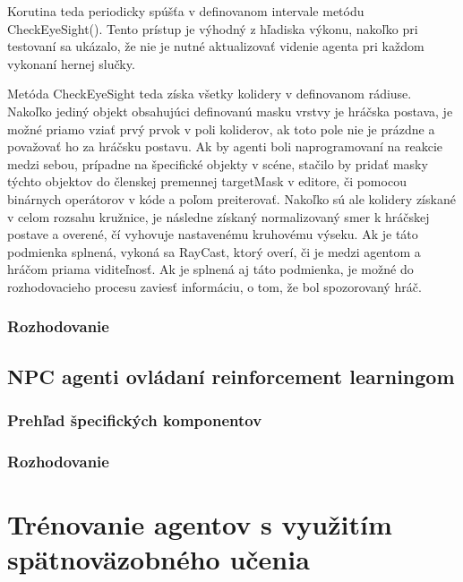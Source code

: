 \documentclass[slovak, master]{diploma}
\begin{document}
Korutina teda periodicky spúšťa v definovanom intervale metódu CheckEyeSight(). Tento prístup je výhodný z hľadiska výkonu, nakoľko pri testovaní sa ukázalo, že nie je nutné aktualizovať videnie agenta pri každom vykonaní hernej slučky. 

Metóda CheckEyeSight teda získa všetky kolidery v definovanom rádiuse. Nakoľko jediný objekt obsahujúci definovanú masku vrstvy je hráčska postava, je možné priamo vziať prvý prvok v poli koliderov, ak toto pole nie je prázdne a považovať ho za hráčsku postavu. Ak by agenti boli naprogramovaní na reakcie medzi sebou, prípadne na špecifické objekty v scéne, stačilo by pridať masky týchto objektov do členskej premennej targetMask v editore, či pomocou binárnych operátorov v kóde a poľom preiterovať. Nakoľko sú ale kolidery získané v celom rozsahu kružnice, je následne získaný normalizovaný smer k hráčskej postave a overené, čí vyhovuje nastavenému kruhovému výseku. Ak je táto podmienka splnená, vykoná sa RayCast, ktorý overí, či je medzi agentom a hráčom priama viditeľnosť. Ak je splnená aj táto podmienka, je možné do rozhodovacieho procesu zaviesť informáciu, o tom, že bol spozorovaný hráč. 

\subsection{Rozhodovanie}
\label{sec:ImplDecisionTrees}

\section{NPC agenti ovládaní reinforcement learningom}
\label{sec:AgentsWithBrain}
\subsection{Prehľad špecifických komponentov}
\label{secAgentsWithBrainComponentOverview} 

\subsection{Rozhodovanie}
\label{sec:ImplReinforcementLearningMLAgent}

\chapter{Trénovanie agentov s využitím spätnoväzobného učenia}
\label{sec:Training}
\end{document}
